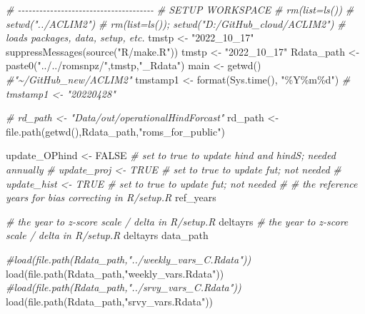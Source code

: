 \documentclass[
]{article}
\newenvironment{Shaded}{\begin{snugshade}}{\end{snugshade}}
\newcommand{\CommentTok}[1]{\textcolor[rgb]{0.56,0.35,0.01}{\textit{#1}}}
\newcommand{\ConstantTok}[1]{\textcolor[rgb]{0.00,0.00,0.00}{#1}}
\newcommand{\FunctionTok}[1]{\textcolor[rgb]{0.00,0.00,0.00}{#1}}
\newcommand{\NormalTok}[1]{#1}
\newcommand{\OtherTok}[1]{\textcolor[rgb]{0.56,0.35,0.01}{#1}}
\newcommand{\StringTok}[1]{\textcolor[rgb]{0.31,0.60,0.02}{#1}}
\begin{document}
\begin{Shaded}
\begin{Highlighting}[]
    \CommentTok{\# {-}{-}{-}{-}{-}{-}{-}{-}{-}{-}{-}{-}{-}{-}{-}{-}{-}{-}{-}{-}{-}{-}{-}{-}{-}{-}{-}{-}{-}{-}{-}{-}{-}{-}{-}{-}{-}{-}}
    \CommentTok{\# SETUP WORKSPACE}
    \CommentTok{\# rm(list=ls())}
    \CommentTok{\# setwd("../ACLIM2")}
    \CommentTok{\# rm(list=ls()); setwd("D:/GitHub\_cloud/ACLIM2")}
    \CommentTok{\# loads packages, data, setup, etc.}
\NormalTok{    tmstp       }\OtherTok{\textless{}{-}} \StringTok{"2022\_10\_17"}
    \FunctionTok{suppressMessages}\NormalTok{(}\FunctionTok{source}\NormalTok{(}\StringTok{"R/make.R"}\NormalTok{))}
\NormalTok{    tmstp       }\OtherTok{\textless{}{-}} \StringTok{"2022\_10\_17"}
\NormalTok{    Rdata\_path  }\OtherTok{\textless{}{-}} \FunctionTok{paste0}\NormalTok{(}\StringTok{"../../romsnpz/"}\NormalTok{,tmstp,}\StringTok{"\_Rdata"}\NormalTok{)}
\NormalTok{    main        }\OtherTok{\textless{}{-}} \FunctionTok{getwd}\NormalTok{()  }\CommentTok{\#"\textasciitilde{}/GitHub\_new/ACLIM2"}
\NormalTok{    tmstamp1    }\OtherTok{\textless{}{-}} \FunctionTok{format}\NormalTok{(}\FunctionTok{Sys.time}\NormalTok{(), }\StringTok{"\%Y\%m\%d"}\NormalTok{)}
    \CommentTok{\# tmstamp1  \textless{}{-} "20220428"}
    
  \CommentTok{\#  rd\_path   \textless{}{-} "Data/out/operationalHindForcast" }
\NormalTok{    rd\_path   }\OtherTok{\textless{}{-}} \FunctionTok{file.path}\NormalTok{(}\FunctionTok{getwd}\NormalTok{(),Rdata\_path,}\StringTok{"roms\_for\_public"}\NormalTok{)}
   
    
    
\NormalTok{    update\_OPhind  }\OtherTok{\textless{}{-}} \ConstantTok{FALSE}   \CommentTok{\# set to true to update hind and hindS; needed annually}
    \CommentTok{\# update\_proj  \textless{}{-} TRUE   \# set to true to update fut; not needed}
    \CommentTok{\# update\_hist  \textless{}{-} TRUE   \# set to true to update fut; not needed}
    \CommentTok{\#  }
    \CommentTok{\# the reference years for bias correcting in R/setup.R}
\NormalTok{    ref\_years }
    
    \CommentTok{\# the year to z{-}score scale / delta in R/setup.R}
\NormalTok{    deltayrs }
    \CommentTok{\# the year to z{-}score scale / delta in R/setup.R}
\NormalTok{    deltayrs }
\NormalTok{    data\_path}
    
    \CommentTok{\#load(file.path(Rdata\_path,"../weekly\_vars\_C.Rdata"))}
    \FunctionTok{load}\NormalTok{(}\FunctionTok{file.path}\NormalTok{(Rdata\_path,}\StringTok{"weekly\_vars.Rdata"}\NormalTok{))}
    \CommentTok{\#load(file.path(Rdata\_path,"../srvy\_vars\_C.Rdata"))}
    \FunctionTok{load}\NormalTok{(}\FunctionTok{file.path}\NormalTok{(Rdata\_path,}\StringTok{"srvy\_vars.Rdata"}\NormalTok{))}
    

\end{Highlighting}
\end{Shaded}
\end{document}
